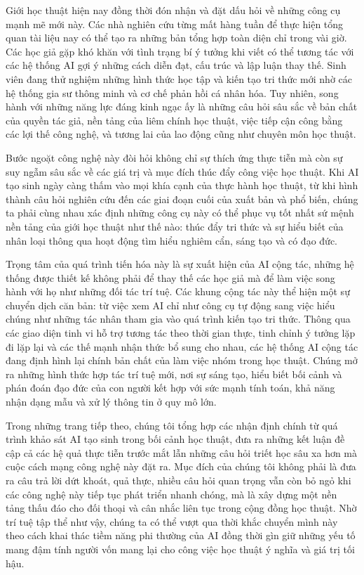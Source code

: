 Giới học thuật hiện nay đồng thời đón nhận và đặt dấu hỏi về những công cụ mạnh mẽ mới này. Các nhà nghiên cứu từng mất hàng tuần để thực hiện tổng quan tài liệu nay có thể tạo ra những bản tổng hợp toàn diện chỉ trong vài giờ. Các học giả gặp khó khăn với tình trạng bí ý tưởng khi viết có thể tương tác với các hệ thống AI gợi ý những cách diễn đạt, cấu trúc và lập luận thay thế. Sinh viên đang thử nghiệm những hình thức học tập và kiến tạo tri thức mới nhờ các hệ thống gia sư thông minh và cơ chế phản hồi cá nhân hóa. Tuy nhiên, song hành với những năng lực đáng kinh ngạc ấy là những câu hỏi sâu sắc về bản chất của quyền tác giả, nền tảng của liêm chính học thuật, việc tiếp cận công bằng các lợi thế công nghệ, và tương lai của lao động cũng như chuyên môn học thuật.

Bước ngoặt công nghệ này đòi hỏi không chỉ sự thích ứng thực tiễn mà còn sự suy ngẫm sâu sắc về các giá trị và mục đích thúc đẩy công việc học thuật. Khi AI tạo sinh ngày càng thấm vào mọi khía cạnh của thực hành học thuật, từ khi hình thành câu hỏi nghiên cứu đến các giai đoạn cuối của xuất bản và phổ biến, chúng ta phải cùng nhau xác định những công cụ này có thể phục vụ tốt nhất sứ mệnh nền tảng của giới học thuật như thế nào: thúc đẩy tri thức và sự hiểu biết của nhân loại thông qua hoạt động tìm hiểu nghiêm cẩn, sáng tạo và có đạo đức.

Trọng tâm của quá trình tiến hóa này là sự xuất hiện của AI cộng tác, những hệ thống được thiết kế không phải để thay thế các học giả mà để làm việc song hành với họ như những đối tác trí tuệ. Các khung cộng tác này thể hiện một sự chuyển dịch căn bản: từ việc xem AI chỉ như công cụ tự động sang việc hiểu chúng như những tác nhân tham gia vào quá trình kiến tạo tri thức. Thông qua các giao diện tinh vi hỗ trợ tương tác theo thời gian thực, tinh chỉnh ý tưởng lặp đi lặp lại và các thế mạnh nhận thức bổ sung cho nhau, các hệ thống AI cộng tác đang định hình lại chính bản chất của làm việc nhóm trong học thuật. Chúng mở ra những hình thức hợp tác trí tuệ mới, nơi sự sáng tạo, hiểu biết bối cảnh và phán đoán đạo đức của con người kết hợp với sức mạnh tính toán, khả năng nhận dạng mẫu và xử lý thông tin ở quy mô lớn.

Trong những trang tiếp theo, chúng tôi tổng hợp các nhận định chính từ quá trình khảo sát AI tạo sinh trong bối cảnh học thuật, đưa ra những kết luận đề cập cả các hệ quả thực tiễn trước mắt lẫn những câu hỏi triết học sâu xa hơn mà cuộc cách mạng công nghệ này đặt ra. Mục đích của chúng tôi không phải là đưa ra câu trả lời dứt khoát, quả thực, nhiều câu hỏi quan trọng vẫn còn bỏ ngỏ khi các công nghệ này tiếp tục phát triển nhanh chóng, mà là xây dựng một nền tảng thấu đáo cho đối thoại và cân nhắc liên tục trong cộng đồng học thuật. Nhờ trí tuệ tập thể như vậy, chúng ta có thể vượt qua thời khắc chuyển mình này theo cách khai thác tiềm năng phi thường của AI đồng thời gìn giữ những yếu tố mang đậm tính người vốn mang lại cho công việc học thuật ý nghĩa và giá trị tối hậu.

